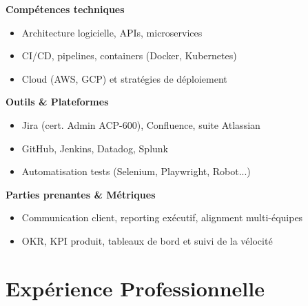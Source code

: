\documentclass[11pt,a4paper]{article}
\newcommand{\skilltitle}[1]{\normalsize\textcolor{primaryblue}{\textbf{#1}}}
\begin{document}
\begin{minipage}[t]{0.42\textwidth}
\skilltitle{Compétences techniques}
\begin{itemize}[leftmargin=10pt]
    \item Architecture logicielle, APIs, microservices
    \item CI/CD, pipelines, containers (Docker, Kubernetes)
    \item Cloud (AWS, GCP) et stratégies de déploiement
\end{itemize}

\skilltitle{Outils \& Plateformes}
\begin{itemize}[leftmargin=10pt]
    \item Jira (cert. Admin ACP-600), Confluence, suite Atlassian
    \item GitHub, Jenkins, Datadog, Splunk
    \item Automatisation tests (Selenium, Playwright, Robot...)
\end{itemize}

\skilltitle{Parties prenantes \& Métriques}
\begin{itemize}[leftmargin=10pt]
    \item Communication client, reporting exécutif, alignment multi-équipes
    \item OKR, KPI produit, tableaux de bord et suivi de la vélocité
\end{itemize}
\end{minipage}

\section*{Expérience Professionnelle}
\end{document}
